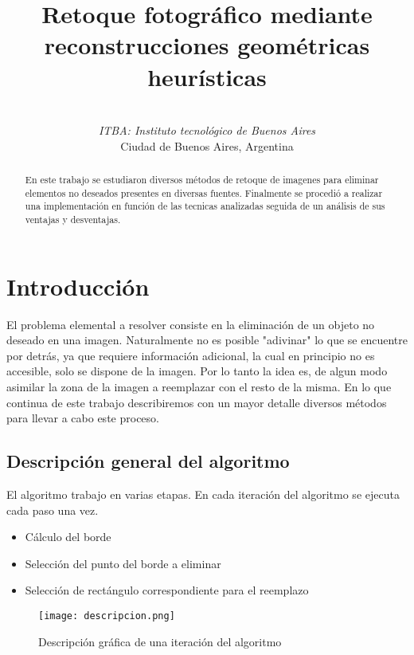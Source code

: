 \documentclass[conference]{IEEEtran}
\begin{document}
\title{Retoque fotográfico mediante reconstrucciones geométricas heurísticas}
\author{
 \\
\textit{ITBA: Instituto tecnológico de Buenos Aires}\\
Ciudad de Buenos Aires, Argentina
}
\maketitle

\begin{abstract}
En este trabajo se estudiaron
 diversos métodos de retoque de imagenes para eliminar elementos no deseados presentes en diversas fuentes. Finalmente se procedió a realizar una implementación en función de las tecnicas analizadas seguida de un análisis de sus ventajas y desventajas.
\end{abstract}

\section{Introducción}
El problema elemental a resolver consiste en la eliminación de un objeto no deseado en una imagen.
Naturalmente no es posible "adivinar" lo que se encuentre por detrás, ya que requiere información adicional, la cual en principio no es accesible, solo se dispone de la imagen. Por lo tanto la idea es, de algun modo asimilar la zona de la imagen a reemplazar con el resto de la misma. En lo que continua de este trabajo describiremos con un mayor detalle diversos métodos para llevar a cabo este proceso.

\subsection{Descripción general del algoritmo}
El algoritmo trabajo en varias etapas. En cada iteración del algoritmo se ejecuta cada paso una vez. 
\begin{itemize}
	\item Cálculo del borde
	\item Selección del punto del borde a eliminar
	\item Selección de rectángulo correspondiente para el reemplazo
	
\end{itemize}

\begin{figure}[!ht]
\begin{centering}
\texttt{[image: descripcion.png]}
\par\end{centering}
\caption{Descripción gráfica de una iteración del algoritmo}
\end{figure}
\end{document}
